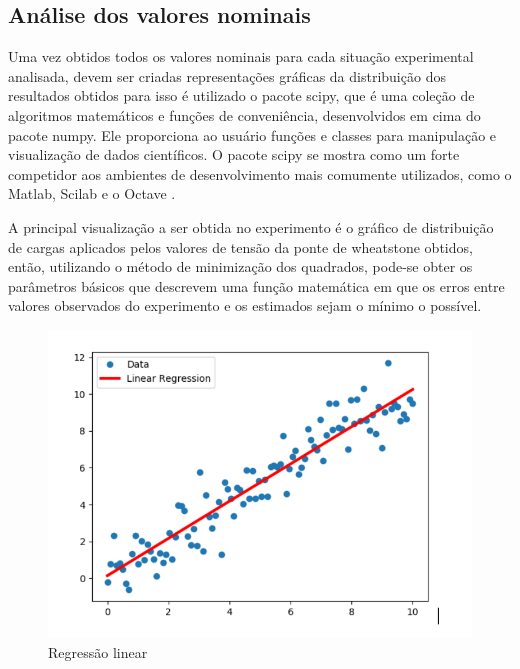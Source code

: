 \subsection{Análise dos valores nominais}

Uma vez obtidos todos os valores nominais para cada situação experimental analisada, devem ser criadas representações gráficas da distribuição dos resultados obtidos para isso é utilizado o pacote scipy, que é uma coleção de algoritmos matemáticos e funções de conveniência, desenvolvidos em cima do pacote numpy. Ele proporciona ao usuário funções e classes para manipulação e visualização de dados científicos. O pacote scipy se mostra como um forte competidor aos ambientes de desenvolvimento mais comumente utilizados, como o Matlab, Scilab e o Octave \autocite{DocsSciPy}.

A principal visualização a ser obtida no experimento é o gráfico de distribuição de cargas aplicados pelos valores de tensão da ponte de wheatstone obtidos, então, utilizando o método de minimização dos quadrados, pode-se obter os parâmetros básicos que descrevem uma função matemática em que os erros entre valores observados do experimento e os estimados sejam o mínimo o possível.

\begin{figure}[htb]
	\caption{\label{fig:1160} Regressão linear}
	\begin{center}
		\includegraphics[width=\textwidth]{pictures/1160.png}
	\end{center}
\end{figure}

